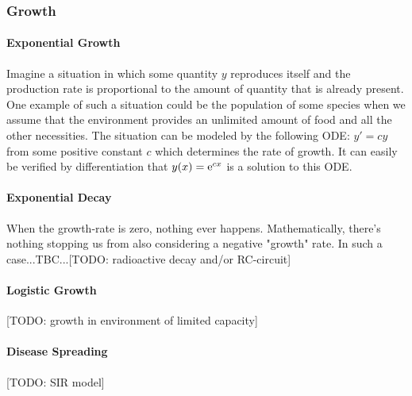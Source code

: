 \subsubsection{Growth}

\paragraph{Exponential Growth} 
Imagine a situation in which some quantity $y$ reproduces itself and the production rate is proportional to the amount of quantity that is already present. One example of such a situation could be the population of some species when we assume that the environment provides an unlimited amount of food and all the other necessities. The situation can be modeled by the following ODE: $y' = c y$ from some positive constant $c$ which determines the rate of growth. It can easily be verified by differentiation that $y(x) = \operatorname{\mathrm{e}}^{c x}$ is a solution to this ODE.


\paragraph{Exponential Decay}
When the growth-rate is zero, nothing ever happens. Mathematically, there's nothing stopping us from also considering a negative "growth" rate. In such a case...TBC...[TODO: radioactive decay and/or RC-circuit]


\paragraph{Logistic Growth} [TODO: growth in environment of limited capacity]


\paragraph{Disease Spreading} [TODO: SIR model]




